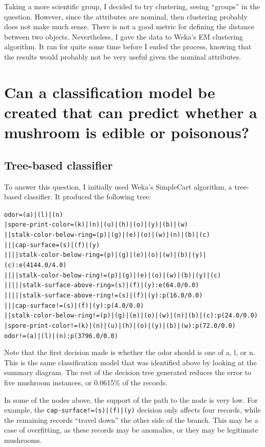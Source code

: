 \documentclass[margin,letterpaper,11pt]{scrartcl}
\begin{document}
Taking a more scientific group, I decided to try clustering, seeing ``groups''
in the question. However, since the attributes are nominal, then clustering
probably does not make much sense. There is not a good metric for defining the
distance between two objects. Nevertheless, I gave the data to Weka's EM
clustering algorithm. It ran for quite some time before I ended the process,
knowing that the results would probably not be very useful given the nominal
attributes.

\section{Can a classification model be created that can predict whether a
mushroom is edible or poisonous?}

\subsection{Tree-based classifier}

To answer this question, I initially used Weka's SimpleCart algorithm, a
tree-based classifier. It produced the following tree:

\begin{alltt}
odor=(a)|(l)|(n)
|  spore-print-color=(k)|(n)|(u)|(h)|(o)|(y)|(b)|(w)
|  |  stalk-color-below-ring=(p)|(g)|(e)|(o)|(w)|(n)|(b)|(c)
|  |  |  cap-surface=(s)|(f)|(y)
|  |  |  |  stalk-color-below-ring=(p)|(g)|(e)|(o)|(w)|(b)|(y)|(c): e(4144.0/4.0)
|  |  |  |  stalk-color-below-ring!=(p)|(g)|(e)|(o)|(w)|(b)|(y)|(c)
|  |  |  |  |  stalk-surface-above-ring=(s)|(f)|(y): e(64.0/0.0)
|  |  |  |  |  stalk-surface-above-ring!=(s)|(f)|(y): p(16.0/0.0)
|  |  |  cap-surface!=(s)|(f)|(y): p(4.0/0.0)
|  |  stalk-color-below-ring!=(p)|(g)|(e)|(o)|(w)|(n)|(b)|(c): p(24.0/0.0)
|  spore-print-color!=(k)|(n)|(u)|(h)|(o)|(y)|(b)|(w): p(72.0/0.0)
odor!=(a)|(l)|(n): p(3796.0/0.0)
\end{alltt}

Note that the first decision made is whether the odor should is one of a, l,
or n. This is the same classification model that was identified above by
looking at the summary diagram. The rest of the decision tree generated
reduces the error to five mushroom instances, or 0.0615\% of the records.

In some of the nodes above, the support of the path to the node is very low.
For example, the \texttt{cap-surface!=(s)|(f)|(y)} decision only affects four
records, while the remaining records ``travel down'' the other side of the
branch. This may be a case of overfitting, as these records may be anomalies,
or they may be legitimate mushrooms.
\end{document}
